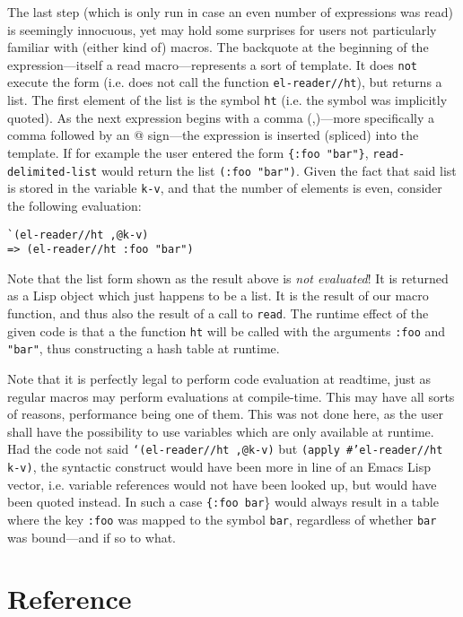 \documentclass[a4paper,10pt,twoside]{report}
\newcommand{\el}{Emacs Lisp}
\newcommand{\sym}[1]{\texttt{#1}}
\newcommand{\fun}[1]{\texttt{#1}}
\newcommand{\Read}{\fun{read}}
\begin{document}
The last step (which is only run in case an even number of expressions was read)
is seemingly innocuous, yet may hold some surprises for users not particularly
familiar with (either kind of) macros.  The backquote at the beginning of the
expression---itself a read macro---represents a sort of template.  It does
\texttt{not} execute the form (i.e. does not call the function
\fun{el-reader//ht}), but returns a list.  The first element of the list is the
symbol \sym{ht} (i.e. the symbol was implicitly quoted).  As the next
expression begins with a comma (,)---more specifically a comma followed by an @
sign---the expression is inserted (spliced) into the template.  If for example
the user entered the form \texttt{\{:foo "bar"\}}, \fun{read-delimited-list} would
return the list \texttt{(:foo "bar")}.  Given the fact that said list is stored
in the variable \sym{k-v}, and that the number of elements is even, consider the
following evaluation:

\begin{lstlisting}[style=lispinline]
`(el-reader//ht ,@k-v)
=> (el-reader//ht :foo "bar")
\end{lstlisting}

Note that the list form shown as the result above is \emph{not evaluated}!  It
is returned as a Lisp object which just happens to be a list.  It is the result
of our macro function, and thus also the result of a call to \Read{}.  The
runtime effect of the given code is that a the function \fun{ht} will
be called with the arguments \texttt{:foo} and \texttt{"bar"}, thus constructing
a hash table at runtime.

Note that it is perfectly legal to perform code evaluation at readtime, just as
regular macros may perform evaluations at compile-time.  This may have all sorts
of reasons, performance being one of them.  This was not done here, as the user
shall have the possibility to use variables which are only available at runtime.
Had the code not said \texttt{`(el-reader//ht ,@k-v)} but \texttt{(apply
  \#'el-reader//ht k-v)}, the syntactic construct would have been more in line
of an \el{} vector, i.e. variable references would not have been looked up, but
would have been quoted instead.  In such a case \texttt{\{:foo bar}\} would
always result in a table where the key \sym{:foo} was mapped to the symbol
\sym{bar}, regardless of whether \sym{bar} was bound---and if so to what.

\pagebreak

\section{Reference}
\label{sec:api-reference}
\end{document}

